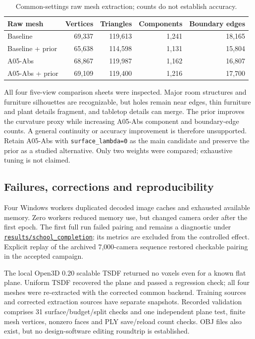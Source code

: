 \documentclass[11pt,a4paper]{article}
\begin{document}
\begin{table}[!ht]
\centering\small
\begin{tabularx}{\linewidth}{@{}Yrrrr@{}}
\toprule
\textbf{Raw mesh} & \textbf{Vertices} & \textbf{Triangles} & \textbf{Components} & \textbf{Boundary edges} \\
\midrule
Baseline & 69,337 & 119,613 & 1,241 & 18,165 \\
Baseline + prior & 65,638 & 114,598 & 1,131 & 15,804 \\
A05-Abs & 68,867 & 119,987 & 1,162 & 16,807 \\
A05-Abs + prior & 69,109 & 119,400 & 1,216 & 17,700 \\
\bottomrule
\end{tabularx}
\caption{Common-settings raw mesh extraction; counts do not establish accuracy.}
\label{tab:surface-mesh}
\end{table}

All four five-view comparison sheets were inspected. Major room structures
and furniture silhouettes are recognizable, but holes remain near edges,
thin furniture and plant details fragment, and tabletop details can merge.
The prior improves the curvature proxy while increasing A05-Abs component
and boundary-edge counts. A general continuity or accuracy improvement is
therefore unsupported. Retain A05-Abs with \texttt{surface\_lambda=0} as the
main candidate and preserve the prior as a studied alternative. Only two
weights were compared; exhaustive tuning is not claimed.

\subsection{Failures, corrections and reproducibility}
Four Windows workers duplicated decoded image caches and exhausted available
memory. Zero workers reduced memory use, but changed camera order after the
first epoch. The first full run failed pairing and remains a diagnostic under
\href{run:results/school_completion_20261109}{\texttt{results/school\_completion}}; its metrics are excluded from the
controlled effect. Explicit replay of the archived 7,000-camera sequence
restored checkable pairing in the accepted campaign.

The local Open3D 0.20 scalable TSDF returned no voxels even for a known flat
plane. Uniform TSDF recovered the plane and passed a regression check; all
four meshes were re-extracted with the corrected common backend. Training
sources and corrected extraction sources have separate snapshots. Recorded
validation comprises 31 surface/budget/split checks and one independent plane
test, finite mesh vertices, nonzero faces and PLY save/reload count checks.
OBJ files also exist, but no design-software editing roundtrip is established.
\end{document}
